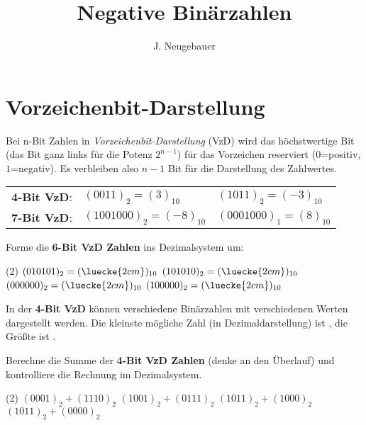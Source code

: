 \documentclass[9pt, a4paper]{scrartcl}
\author{J. Neugebauer}
\title{Negative Binärzahlen}
\date{\Heute}
\begin{document}
\ReiheTitel

\section*{Vorzeichenbit-Darstellung}
\begin{infobox}
Bei n-Bit Zahlen in \emph{Vorzeichenbit-Darstellung} (VzD) wird das höchstwertige Bit (das Bit ganz links für die Potenz $2^{n-1}$) für das Vorzeichen reserviert ($0$=positiv, $1$=negativ). Es verbleiben also $n-1$ Bit für die Darstellung des Zahlwertes.

\begin{tabularx}{\textwidth}{XXX}
	\textbf{4-Bit VzD}: & $(0011)_2 = (3)_{10}$ & $(1011)_2 = (-3)_{10}$ \\
	\textbf{7-Bit VzD}: & $(1001000)_2 = (-8)_{10}$ & $(0001000)_1 = (8)_{10}$
\end{tabularx}
\end{infobox}

\begin{aufgabe}
	Forme die \textbf{6-Bit VzD Zahlen} ins Dezimalsystem um:
	
	\begin{tasks}(2)
		\task $(010101)_2 = (\luecke{2cm})_{10}$
		\task $(101010)_2 = (\luecke{2cm})_{10}$
		\task $(000000)_2 = (\luecke{2cm})_{10}$
		\task $(100000)_2 = (\luecke{2cm})_{10}$
	\end{tasks}
\end{aufgabe}

\begin{aufgabe}
	In der \textbf{4-Bit VzD} können \luecke{2cm} verschiedene Binärzahlen mit \luecke{2cm} verschiedenen Werten dargestellt werden. Die kleinste mögliche Zahl (in Dezimaldarstellung) ist \luecke{2cm}, die Größte ist \luecke{2cm}.
\end{aufgabe}

\begin{aufgabe}
	Berechne die Summe der \textbf{4-Bit VzD Zahlen} (denke an den Überlauf) und kontrolliere die Rechnung im Dezimalsystem.
	
	\begin{tasks}(2)
		\task $(0001)_2 + (1110)_2$
		\task $(1001)_2 + (0111)_2$
		\task $(1011)_2 + (1000)_2$
		\task $(1011)_2 + (0000)_2$
	\end{tasks}
\end{aufgabe}
\end{document}
